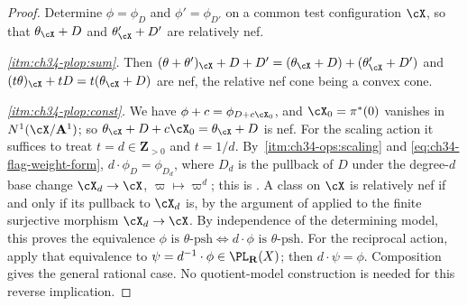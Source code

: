 \begin{proof}
Determine $\phi=\phi_D$ and $\phi'=\phi_{D'}$ on a common test
configuration $\cX$, so that $\theta_{\cX}+D$ and
$\theta'_{\cX}+D'$ are relatively nef.

\emph{\cref{itm:ch34-plop:sum}.}  Then
$(\theta+\theta')_{\cX}+D+D'=(\theta_{\cX}+D)+(\theta'_{\cX}+D')$ and
$(t\theta)_{\cX}+tD=t(\theta_{\cX}+D)$ are nef, the relative nef cone
being a convex cone.

\emph{\cref{itm:ch34-plop:const}.}  We have $\phi+c=\phi_{D+c\cX_0}$, and
$\cX_0=\pi^*(0)$ vanishes in $N^1(\cX/\mathbf A^1)$; so
$\theta_{\cX}+D+c\cX_0=\theta_{\cX}+D$ is nef.  For the scaling action it
suffices to treat $t=d\in\mathbf Z_{>0}$ and $t=1/d$.  By
\,\cref{itm:ch34-ops:scaling} and
\eqref{eq:ch34-flag-weight-form}, $d\cdot\phi_D=\phi_{D_d}$, where
$D_d$ is the pullback of $D$ under the degree-$d$ base change
$\cX_d\to\cX$, $\varpi\mapsto\varpi^d$; this is
\cite[Lemma~2.34]{BJ22}.  A class on $\cX$ is relatively nef if and only
if its pullback to $\cX_d$ is, by the argument of
 applied to the finite surjective
morphism $\cX_d\to\cX$.  By independence of the determining model,
this proves the equivalence
$\phi\text{ is }\theta\text{-psh}\Longleftrightarrow
d\cdot\phi\text{ is }\theta\text{-psh}$.
For the reciprocal action, apply that equivalence to
$\psi=d^{-1}\cdot\phi\in\PL_{\mathbf R}(X)$; then $d\cdot\psi=\phi$.
Composition gives the general rational case.  No quotient-model
construction is needed for this reverse implication.


\end{proof}
